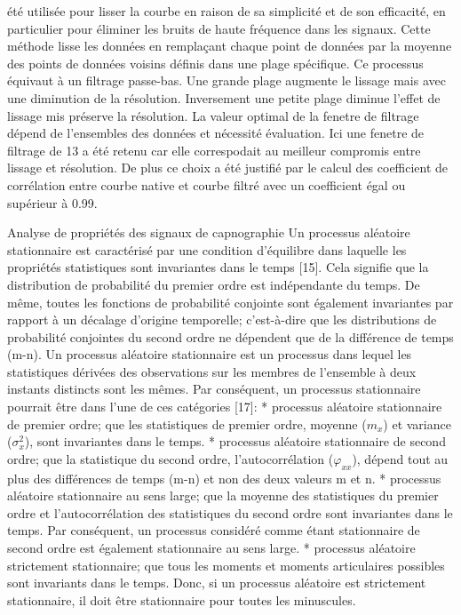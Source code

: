 \documentclass[12pt,]{article}
\begin{document}
été utilisée pour lisser la courbe en raison de sa simplicité et de son
efficacité, en particulier pour éliminer les bruits de haute fréquence
dans les signaux. Cette méthode lisse les données en remplaçant chaque
point de données par la moyenne des points de données voisins définis
dans une plage spécifique. Ce processus équivaut à un filtrage
passe-bas. Une grande plage augmente le lissage mais avec une diminution
de la résolution. Inversement une petite plage diminue l'effet de
lissage mis préserve la résolution. La valeur optimal de la fenetre de
filtrage dépend de l'ensembles des données et nécessité évaluation. Ici
une fenetre de filtrage de 13 a été retenu car elle correspodait au
meilleur compromis entre lissage et résolution. De plus ce choix a été
justifié par le calcul des coefficient de corrélation entre courbe
native et courbe filtré avec un coefficient égal ou supérieur à 0.99.

Analyse de propriétés des signaux de capnographie Un processus aléatoire
stationnaire est caractérisé par une condition d'équilibre dans laquelle
les propriétés statistiques sont invariantes dans le temps {[}15{]}.
Cela signifie que la distribution de probabilité du premier ordre est
indépendante du temps. De même, toutes les fonctions de probabilité
conjointe sont également invariantes par rapport à un décalage d'origine
temporelle; c'est-à-dire que les distributions de probabilité conjointes
du second ordre ne dépendent que de la différence de temps (m-n). Un
processus aléatoire stationnaire est un processus dans lequel les
statistiques dérivées des observations sur les membres de l'ensemble à
deux instants distincts sont les mêmes. Par conséquent, un processus
stationnaire pourrait être dans l'une de ces catégories {[}17{]}: *
processus aléatoire stationnaire de premier ordre; que les statistiques
de premier ordre, moyenne (\(m_{x}\)) et variance (\(\sigma_{x}^{2}\)),
sont invariantes dans le temps. * processus aléatoire stationnaire de
second ordre; que la statistique du second ordre, l'autocorrélation
(\(\varphi_{xx}\)), dépend tout au plus des différences de temps (m-n)
et non des deux valeurs m et n. * processus aléatoire stationnaire au
sens large; que la moyenne des statistiques du premier ordre et
l'autocorrélation des statistiques du second ordre sont invariantes dans
le temps. Par conséquent, un processus considéré comme étant
stationnaire de second ordre est également stationnaire au sens large. *
processus aléatoire strictement stationnaire; que tous les moments et
moments articulaires possibles sont invariants dans le temps. Donc, si
un processus aléatoire est strictement stationnaire, il doit être
stationnaire pour toutes les minuscules.
\end{document}
